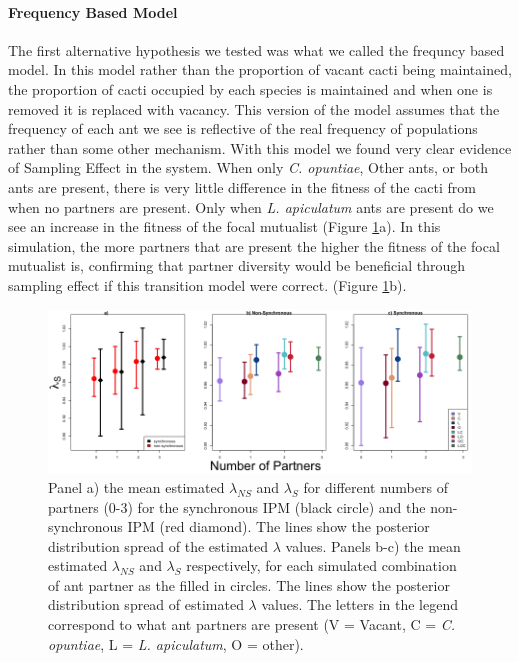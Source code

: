 \documentclass[11pt]{article}
\begin{document}
\paragraph{Frequency Based Model}
The first alternative hypothesis we tested was what we called the frequncy based model.
In this model rather than the proportion of vacant cacti being maintained, the proportion of cacti occupied by each species is maintained and when one is removed it is replaced with vacancy.
This version of the model assumes that the frequency of each ant we see is reflective of the real frequency of populations rather than some other mechanism.
With this model we found very clear evidence of Sampling Effect in the system. 
When only  \textit{C. opuntiae}, Other ants, or both ants are present, there is very little difference in the fitness of the cacti from when no partners are present. 
Only when \textit{L. apiculatum} ants are present do we see an increase in the fitness of the focal mutualist (Figure \ref{app:FreqLambdaMeans}a).
In this simulation, the more partners that are present the higher the fitness of the focal mutualist is, confirming that partner diversity would be beneficial through sampling effect if this transition model were correct.  (Figure \ref{app:FreqLambdaMeans}b).


\begin{figure}
\includegraphics[width=0.91\linewidth]{Figures/Lambdas_Freq_lines.png}
	\caption{Panel a) the mean estimated $\lambda_{NS}$ and $\lambda_{S}$ for different numbers of partners (0-3) for the synchronous IPM (black circle) and the non-synchronous IPM (red diamond). The lines show the posterior distribution spread of the estimated $\lambda$ values. Panels b-c) the mean estimated $\lambda_{NS}$ and $\lambda_{S}$ respectively, for each simulated combination of ant partner as the filled in circles. The lines show the posterior distribution spread of estimated $\lambda$ values. The letters in the legend correspond to what ant partners are present (V = Vacant, C = \textit{C. opuntiae}, L = \textit{L. apiculatum}, O = other).}
\label{app:FreqLambdaMeans}
\end{figure}
\end{document}
